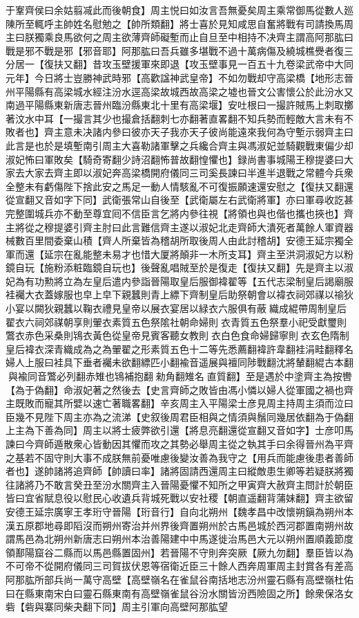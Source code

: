 于鞌齊侯曰余姑翦㓕此而後朝食】周主悦曰如汝言吾無憂矣周主乘常御馬從數人廵陳所至輒呼主帥姓名慰勉之【帥所類翻】將士喜於見知咸思自奮將戰有司請換馬周主曰朕獨乘良馬欲何之周主欲薄齊師礙塹而止自旦至中相持不决齊主謂高阿那肱曰戰是邪不戰是邪【邪音耶】阿那肱曰吾兵雖多堪戰不過十萬病傷及繞城樵㸑者復三分居一【復扶又翻】昔攻玉壁援軍來即退【攻玉壁事見一百五十九卷梁武帝中大同元年】今日將士豈勝神武時邪【高歡諡神武皇帝】不如勿戰却守高梁橋【地形志晉州平陽縣有高梁城水經注汾水逕高梁故城西故高梁之墟也晉文公害懷公於此汾水又南過平陽縣東新唐志晉州臨汾縣東北十里有高梁堰】安吐根曰一撮許賊馬上刺取擲著汶水中耳【一撮言其少也撮倉括翻刺七亦翻著直畧翻不知兵勢而輕敵大言未有不敗者也】齊主意未决諸内參曰彼亦天子我亦天子彼尚能遠來我何為守塹示弱齊主曰此言是也於是填塹南引周主大喜勒諸軍擊之兵纔合齊主與馮淑妃並騎觀戰東偏少却淑妃怖曰軍敗矣【騎奇寄翻少詩沼翻怖普故翻惶懼也】録尚書事城陽王穆提婆曰大家去大家去齊主即以淑妃奔高梁橋開府儀同三司奚長諫曰半進半退戰之常體今兵衆全整未有虧傷陛下捨此安之馬足一動人情駭亂不可復振願速還安慰之【復扶又翻還從宣翻又音如字下同】武衛張常山自後至【武衛屬左右武衛將軍】亦曰軍尋收訖甚完整圍城兵亦不動至尊宜囘不信臣言乞將内參往視【將領也與也偕也攜也挾也】齊主將從之穆提婆引齊主肘曰此言難信齊主遂以淑妃北走齊師大潰死者萬餘人軍資器械數百里間委棄山積【齊人所棄皆為稽胡所取後周人由此討稽胡】安德王延宗獨全軍而還【延宗在亂能整未易才也惜大厦將顛非一木所支耳】齊主至洪洞淑妃方以粉鏡自玩【施粉添粧臨鏡自玩也】後聲亂唱賊至於是復走【復扶又翻】先是齊主以淑妃為有功勲將立為左皇后遣内參詣晉陽取皇后服御褘翟等【五代志梁制皇后謁廟服袿䙱大衣蓋嫁服也皁上皁下親蠶則青上縹下齊制皇后助祭朝會以褘衣祠郊禖以䄖狄小宴以闕狄親蠶以鞠衣禮見皇帝以展衣宴居以緑衣六服俱有蔽織成緄帶周制皇后翟衣六祠郊禖朝享則翬衣素質五色祭隂社朝命婦則衣青質五色祭羣小祀受獻璽則鷩衣赤色采桑則鴇衣黃色從皇帝見賓客聽女教則衣白色食命婦歸寧則衣玄色隋制皇后褘衣深青織成為之為翬翟之形素質五色十二等先悉薦翻褘許韋翻袿涓畦翻釋名婦人上服曰袿具下垂者䙱未欲翻縹匹小翻褕音遥展與襢同陟戰翻沈將輦翻緄古本翻與褕同音鷩必列翻赤雉也鴇補抱翻勑角翻雉名直質翻】至是遇於中塗齊主為按轡【為于偽翻】命淑妃著之然後去【史言齊師之敗皆由馮小憐以婦人從軍國之禍也齊主既敗而寵其所嬖以速亡著職畧翻】辛亥周主入平陽梁士彦見周主持周主須而泣曰臣幾不見陛下周主亦為之流涕【史叙後周君臣相與之情須與鬚同幾居依翻為于偽翻上主為下善為同】周主以將士疲弊欲引還【將息亮翻還從宣翻又音如字】士彦叩馬諫曰今齊師遁散衆心皆動因其懼而攻之其勢必舉周主從之執其手曰余得晉州為平齊之基若不固守則大事不成朕無前憂唯慮後變汝善為我守之【用兵而能慮後患者善師者也】遂帥諸將追齊師【帥讀曰率】諸將固請西還周主曰縱敵患生卿等若疑朕將獨往諸將乃不敢言癸丑至汾水關齊主入晉陽憂懼不知所之甲寅齊大赦齊主問計於朝臣皆曰宜省賦息役以慰民心收遺兵背城死戰以安社稷【朝直遥翻背蒲妹翻】齊主欲留安德王延宗廣寧王孝珩守晉陽【珩音行】自向北朔州【魏孝昌中改懷朔鎭為朔州本漢五原郡地尋即䧟沒而朔州寄治并州界後齊置朔州於古馬邑城於西河郡置南朔州故謂馬邑為北朔州新唐志曰朔州本治善陽建中中馬遂徙治馬邑大元以朔州置順義節度領鄯陽窟谷二縣而以馬邑縣置固州】若晉陽不守則奔突厥【厥九勿翻】羣臣皆以為不可帝不從開府儀同三司賀拔伏恩等宿衛近臣三十餘人西奔周軍周主封賞各有差高阿那肱所部兵尚一萬守高壁【高壁嶺名在雀鼠谷南括地志汾州靈石縣有高壁嶺杜佑曰在縣東南宋白曰靈石縣東南有高壁嶺雀鼠谷汾水關皆汾西險固之所】餘衆保洛女砦【砦與寨同柴夬翻下同】周主引軍向高壁阿那肱望